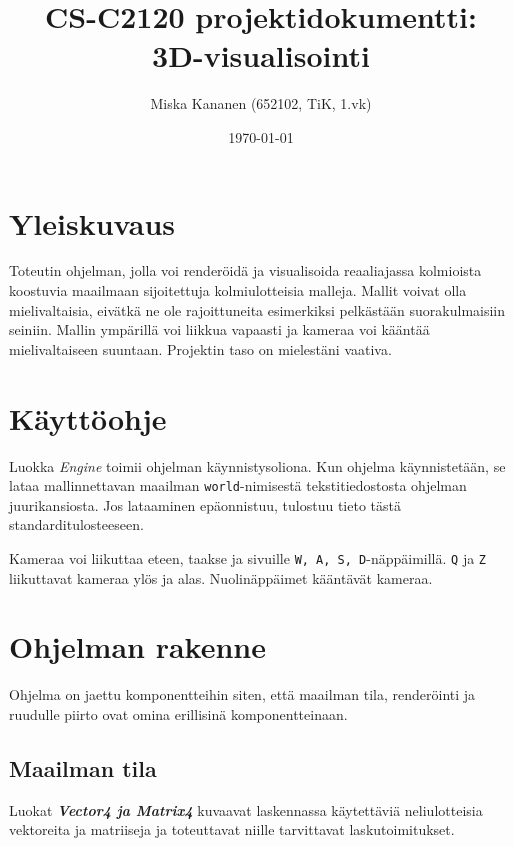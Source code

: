 \documentclass[12pt] {article}
\begin{document}
\title {CS-C2120 projektidokumentti: \\ 3D-visualisointi}
\author {Miska Kananen (652102, TiK, 1.vk)}
\date {\today}
\maketitle

\tableofcontents

\section {Yleiskuvaus}

Toteutin ohjelman, jolla voi renderöidä ja visualisoida reaaliajassa kolmioista koostuvia maailmaan sijoitettuja kolmiulotteisia malleja. Mallit voivat olla mielivaltaisia, eivätkä ne ole rajoittuneita esimerkiksi pelkästään suorakulmaisiin seiniin. Mallin ympärillä voi liikkua vapaasti ja kameraa voi kääntää mielivaltaiseen suuntaan. Projektin taso on mielestäni vaativa.

\section {Käyttöohje}

Luokka \textit{Engine} toimii ohjelman käynnistysoliona. Kun ohjelma käynnistetään, se lataa mallinnettavan maailman \texttt{world}-nimisestä tekstitiedostosta ohjelman juurikansiosta. Jos lataaminen epäonnistuu, tulostuu tieto tästä standarditulosteeseen.

Kameraa voi liikuttaa eteen, taakse ja sivuille \texttt{W, A, S, D}-näppäimillä. \texttt{Q} ja \texttt{Z} liikuttavat kameraa ylös ja alas. Nuolinäppäimet kääntävät kameraa.

\section {Ohjelman rakenne}

Ohjelma on jaettu komponentteihin siten, että maailman tila, renderöinti ja ruudulle piirto ovat omina erillisinä komponentteinaan.

\subsection {Maailman tila}

Luokat \textit{\textbf{Vector4 ja Matrix4}} kuvaavat laskennassa käytettäviä neliulotteisia vektoreita ja matriiseja ja toteuttavat niille tarvittavat laskutoimitukset.
\end{document}
